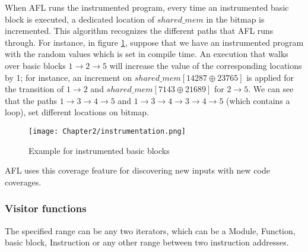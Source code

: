 \vspace{\baselineskip}

When AFL runs the instrumented program, every time an instrumented basic block is executed, a dedicated location of $shared\_mem$ in the bitmap is incremented. This algorithm recognizes the different paths that AFL runs through. For instance, in figure \ref{fig:instrumentation}, suppose that we have an instrumented program with the random values which is set in compile time. An execution that walks over basic blocks $1\rightarrow2\rightarrow5$ will increase the value of the corresponding locations by 1; for instance, an increment on $shared\_mem[14287 \oplus 23765]$ is applied for the transition of $1\rightarrow2$ and $shared\_mem[7143 \oplus 21689]$ for $2\rightarrow5$. We can see that the paths $1\rightarrow3\rightarrow4\rightarrow5$ and $1\rightarrow3\rightarrow4\rightarrow3\rightarrow4\rightarrow5$ (which contains a loop), set different locations on bitmap.


\begin{figure}[htpb]
    \texttt{[image: Chapter2/instrumentation.png]}
    \centering
    \captionsetup{justification=centering}
    \caption{Example for instrumented basic blocks}
    \label{fig:instrumentation}
\end{figure}

AFL uses this coverage feature for discovering new inputs with new code coverages.

\subsubsection*{Visitor functions}




The specified range can be any two iterators, which can be a Module, Function, basic block, Instruction or any other range between two instruction addresses.
